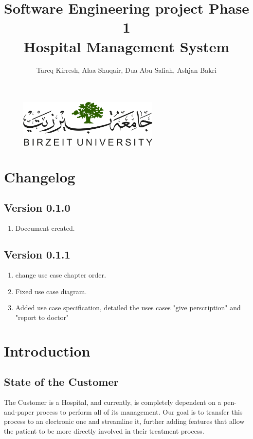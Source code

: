 \documentclass[14pt]{article}
\title{Software Engineering project Phase 1\\Hospital Management System}
\author{Tareq Kirresh, Alaa Shuqair, Dua Abu Safiah, Ashjan Bakri}
\begin{document}
\begin{figure}
\centering
  \includegraphics[width=7cm]{LOGO.png}
\end{figure}
\maketitle
\newpage
\tableofcontents 
\newpage 
\section*{Changelog}
\subsection*{Version 0.1.0}
\begin{enumerate}
	\item Doccument created.
\end{enumerate}
\subsection*{Version 0.1.1}
\begin{enumerate}
	\item change use case chapter order.
	\item Fixed use case diagram.
	\item Added use case specification, detailed the uses cases "give perscription" and  "report to doctor"
\end{enumerate}
\newpage
\section{Introduction}
\subsection{State of the Customer}
The Customer is a Hospital, and currently, is completely dependent on a pen-and-paper process to perform all of its management. Our goal
is to transfer this process to an electronic one and streamline it, further adding features that allow the patient to be more 
directly involved in their treatment process. 
\end{document}
